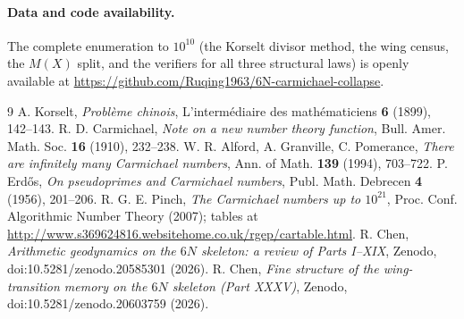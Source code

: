 \documentclass[11pt]{article}
\theoremstyle{plain}
\theoremstyle{definition}
\begin{document}
\paragraph{Data and code availability.}
The complete enumeration to $10^{10}$ (the Korselt divisor method, the wing census, the $M(X)$ split,
and the verifiers for all three structural laws) is openly available at
\url{https://github.com/Ruqing1963/6N-carmichael-collapse}.

\begin{thebibliography}{9}
 A. Korselt, \emph{Probl\`eme chinois}, L'interm\'ediaire des math\'ematiciens \textbf{6} (1899), 142--143.
 R. D. Carmichael, \emph{Note on a new number theory function}, Bull. Amer. Math. Soc. \textbf{16} (1910), 232--238.
 W. R. Alford, A. Granville, C. Pomerance, \emph{There are infinitely many Carmichael numbers}, Ann. of Math. \textbf{139} (1994), 703--722.
 P. Erd\H{o}s, \emph{On pseudoprimes and Carmichael numbers}, Publ. Math. Debrecen \textbf{4} (1956), 201--206.
 R. G. E. Pinch, \emph{The Carmichael numbers up to $10^{21}$}, Proc. Conf. Algorithmic Number Theory (2007); tables at \url{http://www.s369624816.websitehome.co.uk/rgep/cartable.html}.
 R. Chen, \emph{Arithmetic geodynamics on the $6N$ skeleton: a review of Parts I--XIX}, Zenodo, doi:10.5281/zenodo.20585301 (2026).
 R. Chen, \emph{Fine structure of the wing-transition memory on the $6N$ skeleton (Part XXXV)}, Zenodo, doi:10.5281/zenodo.20603759 (2026).
\end{thebibliography}
\end{document}
